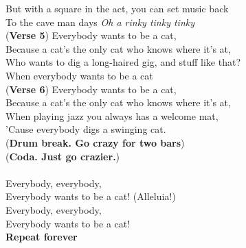 But with a square in the act, you can set music back\\
To the cave man days \emph{Oh a rinky tinky tinky}\\
(\textbf{Verse 5}) Everybody wants to be a cat,\\
Because a cat's the only cat who knows where it's at,\\
Who wants to dig a long-haired gig, and stuff like that?\\
When everybody wants to be a cat\\
(\textbf{Verse 6}) Everybody wants to be a cat,\\
Because a cat's the only cat who knows where it's at,\\
When playing jazz you always has a welcome mat,\\
'Cause everybody digs a swinging cat.\\
(\textbf{Drum break. Go crazy for two bars})\\
(\textbf{Coda. Just go crazier.})\\
     \\
Everybody, everybody,\\
 Everybody wants to be a cat! (Alleluia!)\\
Everybody, everybody,\\
 Everybody wants to be a cat!\\
\textbf{Repeat forever}


